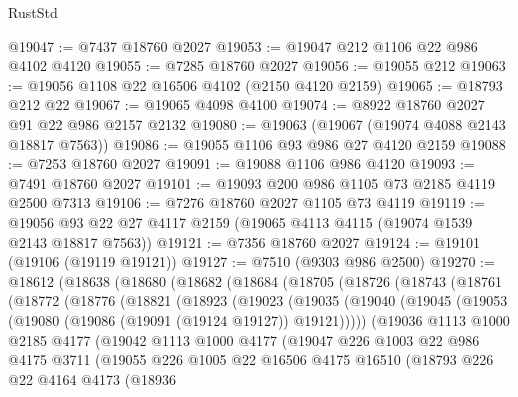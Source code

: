 \begin{lexlean}{RustStd}
\begin{coremodule}
@19047 := @7437 @18760 @2027
@19053 := @19047 @212 @1106 @22 @986 @4102 @4120
@19055 := @7285 @18760 @2027
@19056 := @19055 @212
@19063 := @19056 @1108 @22 @16506 @4102 (@2150 @4120 @2159)
@19065 := @18793 @212 @22
@19067 := @19065 @4098 @4100
@19074 := @8922 @18760 @2027 @91 @22 @986 @2157 @2132
@19080 := @19063 (@19067 (@19074 @4088 @2143 @18817 @7563))
@19086 := @19055 @1106 @93 @986 @27 @4120 @2159
@19088 := @7253 @18760 @2027
@19091 := @19088 @1106 @986 @4120
@19093 := @7491 @18760 @2027
@19101 := @19093 @200 @986 @1105 @73 @2185 @4119 @2500 @7313
@19106 := @7276 @18760 @2027 @1105 @73 @4119
@19119 := @19056 @93 @22 @27 @4117 @2159 (@19065 @4113 @4115 (@19074 @1539 @2143 @18817 @7563))
@19121 := @7356 @18760 @2027
@19124 := @19101 (@19106 (@19119 @19121))
@19127 := @7510 (@9303 @986 @2500)
@19270 := @18612
    (@18638
      (@18680
        (@18682
          (@18684
            (@18705
              (@18726
                (@18743
                  (@18761
                    (@18772
                      (@18776
                        (@18821
                          (@18923
                            (@19023
                              (@19035
                                (@19040
                                  (@19045
                                    (@19053 (@19080 (@19086 (@19091 (@19124 @19127)) @19121)))))
                                (@19036
                                  @1113
                                  @1000
                                  @2185
                                  @4177
                                  (@19042
                                    @1113
                                    @1000
                                    @4177
                                    (@19047
                                      @226
                                      @1003
                                      @22
                                      @986
                                      @4175
                                      @3711
                                      (@19055
                                        @226
                                        @1005
                                        @22
                                        @16506
                                        @4175
                                        @16510
                                        (@18793
                                          @226
                                          @22
                                          @4164
                                          @4173
                                          (@18936

\end{coremodule}
\end{lexlean}
